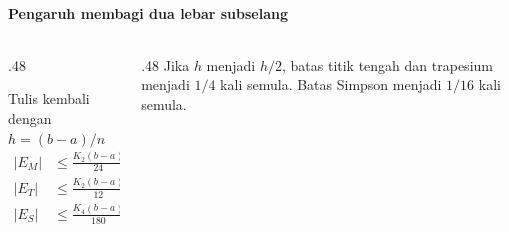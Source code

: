 \documentclass{../../kalkulus-ppt}
\begin{document}
\begin{frame}{\insertsection}
    \framesubtitle{Pengaruh membagi dua lebar subselang}
    \begin{columns}[c,onlytextwidth]
        \begin{column}{.48\textwidth}
            \begin{block}{Tulis kembali dengan $h=(b-a)/n$}
                \[
                    \begin{aligned}
                        |E_M|&\le\tfrac{K_2(b-a)}{24}h^2,\\
                        |E_T|&\le\tfrac{K_2(b-a)}{12}h^2,\\
                        |E_S|&\le\tfrac{K_4(b-a)}{180}h^4.
                    \end{aligned}
                \]
            \end{block}
        \end{column}
        \begin{column}{.48\textwidth}
            Jika $h$ menjadi $h/2$, batas titik tengah dan trapesium
            menjadi $1/4$ kali semula. Batas Simpson menjadi $1/16$ kali semula.
        \end{column}
    \end{columns}
\end{frame}
\end{document}
